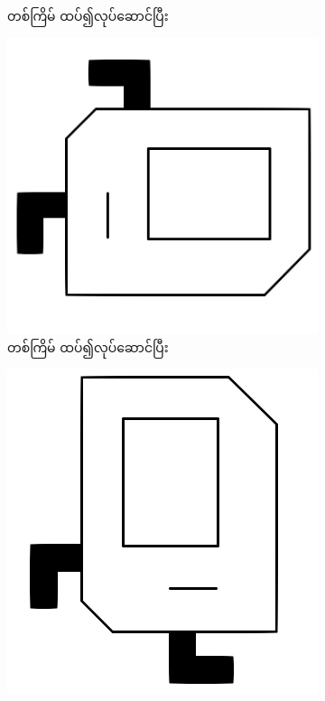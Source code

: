 \begin{sloppypar}
\begin{figure}[tbh!]
\begin{subfigure}[t]{0.4\textwidth}
        \caption{ တစ်ကြိမ် ထပ်၍လုပ်ဆောင်ပြီး}
    \end{subfigure}
    \begin{subfigure}[t]{0.4\textwidth}
        \includegraphics[scale=0.2, left]{ch01/karel_icon_S.png}
        \caption{ တစ်ကြိမ် ထပ်၍လုပ်ဆောင်ပြီး}
    \end{subfigure}
    \begin{subfigure}[t]{0.4\textwidth}
        \includegraphics[scale=0.2, left]{ch01/karel_icon_E.png}

\end{subfigure}
\end{figure}
\end{sloppypar}
